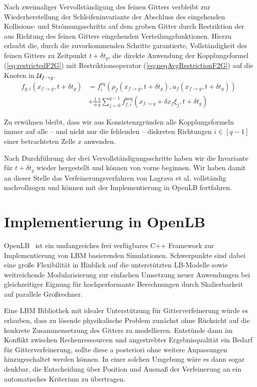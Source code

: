 \begin{description}[style=unboxed,leftmargin=0cm]
\item[Vervollständigung von \(\G\) zu Zeitpunkt \(t+\delta t_g\):] Nach zweimaliger Vervollständigung des feinen Gitters verbleibt zur Wiederherstellung der Schleifeninvariante der Abschluss des eingehenden Kollisions- und Strömungsschritts auf dem groben Gitter durch Restriktion der aus Richtung des feinen Gitters eingehenden Verteilungsfunktionen. Hierzu erlaubt die, durch die zuvorkommenden Schritte garantierte, Vollständigkeit des feinen Gitters zu Zeitpunkt \(t+\delta t_g\), die direkte Anwendung der Kopplungsformel (\ref{eq:restrictedF2G}) mit Restriktionsoperator (\ref{eq:neqAvgRestrictionF2G}) auf die Knoten in \(\mathcal{U}_{f \to g}\).
\begin{align*}
f_{g,i}(x_{f \to g},t+\delta t_g) &= f_i^\text{eq}(\rho_f(x_{f \to g},t+\delta t_g), u_f(x_{f \to g},t+\delta t_g))\\
&+ \frac{1}{\alpha} \frac{1}{q} \sum_{j=0}^{q-1} f_{f,i}^\text{neq}(x_{f \to g} + \delta x_f \xi_j,t+\delta t_g)
\end{align*}
\end{description}
Zu erwähnen bleibt, dass wir aus Konsistenzgründen alle Kopplungsformeln immer auf alle -- und nicht nur die fehlenden -- diskreten Richtungen \(i \in [q-1]\) einer betrachteten Zelle \(x\) anwenden.

\bigskip
Nach Durchführung der drei Vervollständigungsschritte haben wir die Invariante für \(t+\delta t_g\) wieder hergestellt und können von vorne beginnen. Wir haben damit an dieser Stelle das Verfeinerungsverfahren von Lagrava et al. vollständig nachvollzogen und können mit der Implementierung in OpenLB fortfahren.

\newpage
\section{Implementierung in OpenLB}

OpenLB~\cite{olb12} ist ein umfangreiches frei verfügbares C++ Framework zur Implementierung von LBM basierenden Simulationen. Schwerpunkte sind dabei eine große Flexibilität in Hinblick auf die unterstützten LB-Modelle sowie weitreichende Modularisierung zur einfachen Umsetzung neuer Anwendungen bei gleichzeitiger Eignung für hochperformante Berechnungen durch Skalierbarkeit auf parallele Großrechner.

\bigskip
Eine LBM Bibliothek mit idealer Unterstützung für Gitterverfeinerung würde es erlauben, dass zu lösende physikalische Problem zunächst ohne Rücksicht auf die konkrete Zusammensetzung des Gitters zu modellieren. Entstünde dann im Konflikt zwischen Rechenressourcen und angestrebter Ergebnisqualität ein Bedarf für Gitterverfeinerung, sollte diese a posteriori ohne weitere Anpassungen hinzugeschaltet werden können. In einer solchen Umgebung wäre es dann sogar denkbar, die Entscheidung über Position und Ausmaß der Verfeinerung an ein automatisches Kriterium \cite{Lagrava15} zu übertragen.

